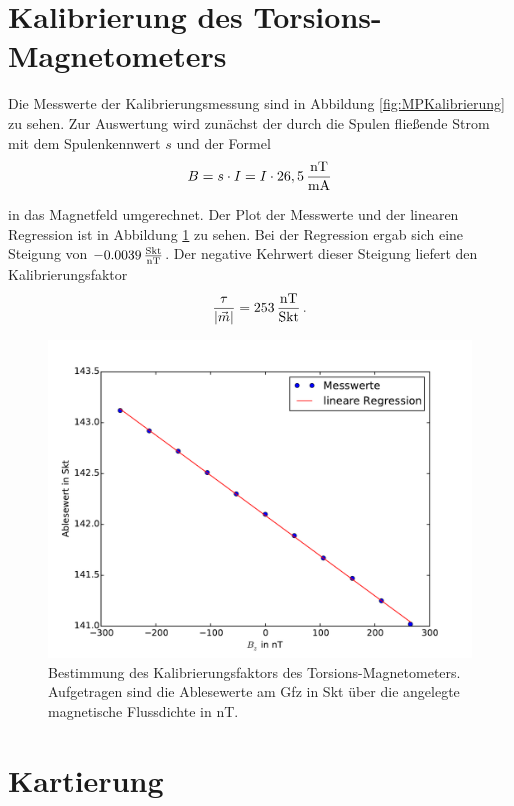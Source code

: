 \section{Kalibrierung des Torsions-Magnetometers}

Die Messwerte der Kalibrierungsmessung sind in Abbildung \ref{fig:MPKalibrierung} zu sehen. Zur Auswertung wird zunächst der durch die Spulen fließende Strom mit dem Spulenkennwert $s$ und der Formel
\begin{equation}
 B=s\cdot I=I\cdot 26,5\,\frac{\mathrm{nT}}{\mathrm{mA}} 
\end{equation}

in das Magnetfeld umgerechnet. Der Plot der Messwerte und der linearen Regression ist in Abbildung \ref{fig:kalibrierung} zu sehen. Bei der Regression ergab sich eine Steigung von $-0.0039\,\frac{\mathrm{Skt}}{\mathrm{nT}}$. Der negative Kehrwert dieser Steigung liefert den Kalibrierungsfaktor
\begin{equation}
 \frac{\tau}{|\vec{m}|}=253\,\frac{\mathrm{nT}}{\mathrm{Skt}} \text{\,.}
\end{equation}

\begin{figure}[!ht]
 \centering
 \includegraphics[width=\textwidth]{fig/kalibrierung.pdf}
 \caption[Bestimmung des Kalibrierungsfaktors des Torsions-Magnetometers]{Bestimmung des Kalibrierungsfaktors des Torsions-Magnetometers. Aufgetragen sind die Ablesewerte am Gfz in Skt über die angelegte magnetische Flussdichte in nT.}
 \label{fig:kalibrierung}
\end{figure}

\section{Kartierung}

